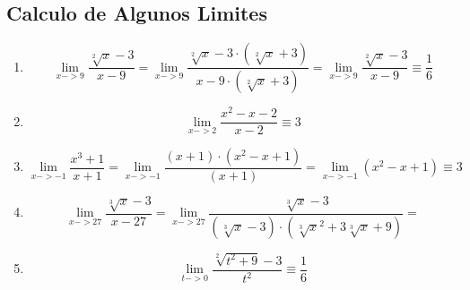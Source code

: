 \documentclass{article}
\begin{document}
            \subsection{Calculo de Algunos Limites}
            \begin{enumerate}
                \item \begin{equation}
                    \lim_{x->9} \frac{\sqrt[2]{x}-3}{x-9} =
                    \lim_{x->9} \frac{\sqrt[2]{x}-3 \cdot (\sqrt[2]{x} +3)}{x-9 \cdot (\sqrt[2]{x} +3)}  =
                    \lim_{x->9} \frac{\sqrt[2]{x}-3}{x-9} \equiv \frac{1}{6}
                \end{equation}
                \item \begin{equation} \lim_{x->2} \frac{x^2-x-2}{x-2} \equiv 3
                \end{equation}
                \item \begin{equation}
                    \lim_{x->-1} \frac{x^3 +1}{x+1} = 
                    \lim_{x->-1} \frac{(x+1)\cdot (x^2-x+1)}{(x+1)}=
                    \lim_{x->-1} (x^2-x+1) \equiv 3
                \end{equation}
                \item  \begin{equation}
                    \lim_{x->27} \frac{\sqrt[3]{x}-3}{x-27} =
                    \lim_{x->27} \frac{\sqrt[3]{x}-3}{(\sqrt[3]{x}-3) \cdot (\sqrt[3]{x}^2 + 3\sqrt[3]{x}+9)} =
                \end{equation}
                \item  \begin{equation}
                    \lim_{t->0} \frac{\sqrt[2]{t^2 +9}-3}{t^2} \equiv \frac{1}{6}
                \end{equation}
            \end{enumerate}
\end{document}

